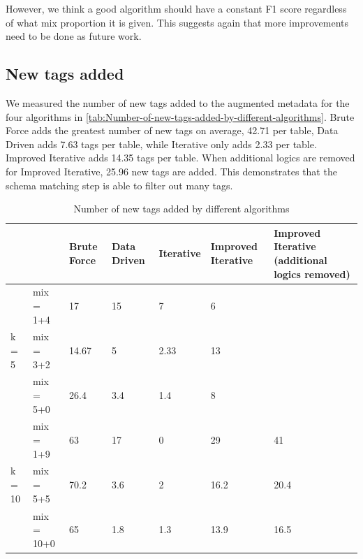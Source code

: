 However, we think a good algorithm should have a constant F1 score regardless of what mix proportion it is given. This suggests again that more improvements need to be done as future work.

\subsection{New tags added}

We measured the number of new tags added to the augmented metadata for the four algorithms in \autoref{tab:Number-of-new-tags-added-by-different-algorithms}. Brute Force adds the greatest number of new tags on average, 42.71 per table, Data Driven adds 7.63 tags per table, while Iterative only adds 2.33 per table. Improved Iterative adds 14.35 tags per table. When additional logics are removed for Improved Iterative, 25.96 new tags are added. This demonstrates that the schema matching step is able to filter out many tags.

\begin{table}[ht!]
    \centering
    \scriptsize
    \begin{center}
      \caption{Number of new tags added by different algorithms}
      \label{tab:Number-of-new-tags-added-by-different-algorithms}
      \begin{tabular}{|p{}|p{}|p{}|p{}|p{}|p{}|p{}|}  
        \hline
         & & \textbf{Brute Force} & \textbf{Data Driven} & \textbf{Iterative} & \textbf{Improved Iterative} & \textbf{Improved Iterative (additional logics removed)}\\
        \hline
        \multirow{3}{*}{k = 5} & mix = 1+4 & 17 & 15 & 7 & 6 & \\
        \cline{2-7}
        & mix = 3+2 & 14.67 & 5 & 2.33 & 13 & \\
        \cline{2-7}
        & mix = 5+0 & 26.4 & 3.4 & 1.4 & 8 & \\
        \hline        
        \multirow{3}{*}{k = 10} & mix = 1+9 & 63 & 17 & 0 & 29 & 41 \\
        \cline{2-7}
        & mix = 5+5 & 70.2 & 3.6 & 2 & 16.2 & 20.4 \\
        \cline{2-7}
        & mix = 10+0 & 65 & 1.8 & 1.3 & 13.9 & 16.5 \\
        \hline
      \end{tabular}
    \end{center}
\end{table}


